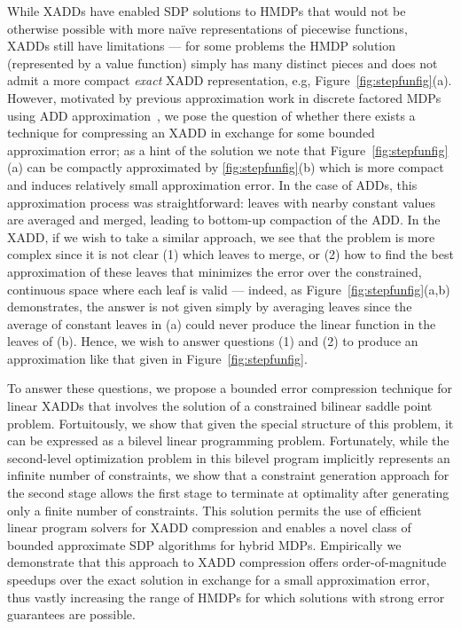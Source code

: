 While XADDs have enabled SDP solutions to HMDPs that would not be
otherwise possible with more na\"{i}ve representations of piecewise
functions, XADDs still have limitations --- for some problems the HMDP
solution (represented by a value function) simply has many distinct
pieces and does not admit a more compact \emph{exact} XADD
representation, e.g, Figure~\ref{fig:stepfunfig}(a).  However,
motivated by previous approximation work in discrete factored MDPs
using ADD approximation~\cite{apricodd}, we pose the question of
whether there exists a technique for compressing an XADD in exchange
for some bounded approximation error; as a hint of the solution we
note that Figure~\ref{fig:stepfunfig}(a) can be compactly approximated
by \ref{fig:stepfunfig}(b) which is more compact and induces
relatively small approximation error.  In the case of ADDs, this
approximation process was straightforward: leaves with nearby constant
values are averaged and merged, leading to bottom-up compaction of the
ADD.  In the XADD, if we wish to take a similar approach, we see that
the problem is more complex since it is not clear (1) which leaves to
merge, or (2) how to find the best approximation of these leaves that
minimizes the error over the constrained, continuous space where each
leaf is valid --- indeed, as Figure~\ref{fig:stepfunfig}(a,b)
demonstrates, the answer is not given simply by averaging leaves since
the average of constant leaves in (a) could never produce the linear
function in the leaves of (b).  Hence, we wish to answer questions (1)
and (2) to produce an approximation like that given in
Figure~\ref{fig:stepfunfig}.

To answer these questions, we propose a bounded error compression
technique for linear XADDs that involves the solution of a constrained
bilinear saddle point problem.  Fortuitously, we show that given the
special structure of this problem, it can be expressed as a bilevel
linear programming problem.%
Fortunately, while the second-level optimization problem in this
bilevel program implicitly represents an infinite number of
constraints, we show that a constraint generation approach for 
the second stage allows the first stage to terminate at
optimality after generating only a finite number of constraints.  This
solution permits the use of efficient linear program solvers for XADD
compression and enables a novel class of bounded approximate SDP
algorithms for hybrid MDPs.  Empirically we demonstrate that this
approach to XADD compression offers order-of-magnitude speedups over
the exact solution in exchange for a small approximation error, thus
vastly increasing the range of HMDPs for which solutions with strong
error guarantees are possible.

